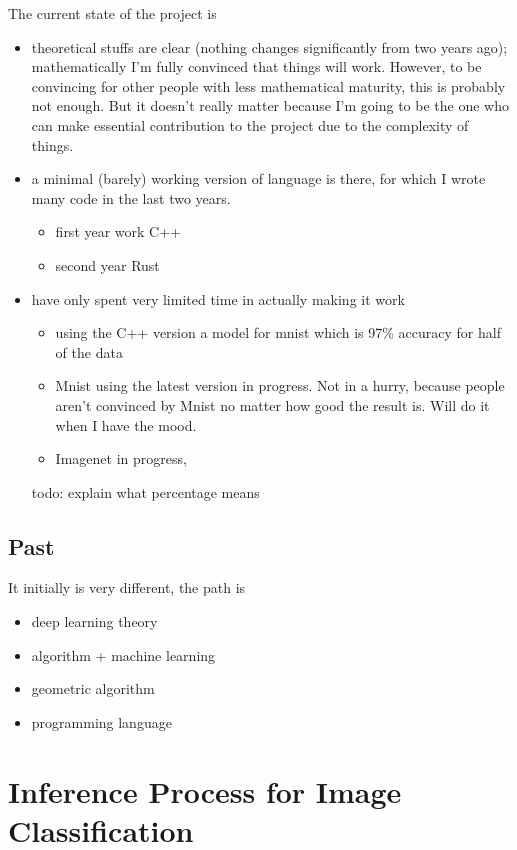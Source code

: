 \documentclass[11pt, oneside]{article}   	%
\theoremstyle{definition}
\begin{document}
The current state of the project is
\begin{itemize}
	\item theoretical stuffs are clear (nothing changes significantly from two years ago); mathematically I'm fully convinced that things will work. However, to be convincing for other people with less mathematical maturity, this is probably not enough. But it doesn't really matter because I'm going to be the one who can make essential contribution to the project due to the complexity of things.
	\item a minimal (barely) working version of language is there, for which I wrote many code in the last two years.
	\begin{itemize}
		\item first year work C++
		\item second year Rust
	\end{itemize}
	\item have only spent very limited time in actually making it work
	\begin{itemize}
		\item using the C++ version a model for mnist which is 97\% accuracy for half of the data 
		\item Mnist using the latest version in progress. Not in a hurry, because people aren't convinced by Mnist no matter how good the result is. Will do it when I have the mood.
		\item Imagenet in progress, 
	\end{itemize}
\begin{rmk}
	todo: explain what percentage means
\end{rmk}
\end{itemize}

\subsection{Past}

It initially is very different, the path is
\begin{itemize}
	\item deep learning theory
	\item algorithm + machine learning
	\item geometric algorithm
	\item programming language
\end{itemize}

\section{Inference Process for Image Classification}
\end{document}
